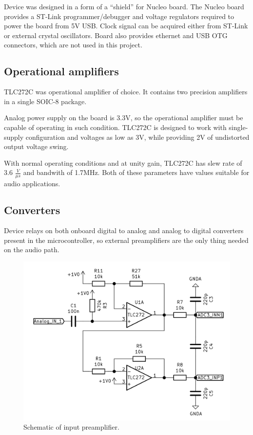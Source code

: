 \documentclass[a4paper,twoside,12pt]{book}
\begin{document}
Device was designed in a form of a “shield” for Nucleo board.
The Nucleo board provides a ST-Link programmer/debugger
and voltage regulators required to power the board from 5V USB.
Clock signal can be acquired either from ST-Link or
external crystal oscillators.
Board also provides ethernet and USB OTG connectors,
which are not used in this project.

\subsection {Operational amplifiers}
TLC272C was operational amplifier of choice\cite{TI:TLC272}.
It contains two precision amplifiers in a single SOIC-8 package.

Analog power supply on the board is 3.3V, so the operational amplifier
must be capable of operating in such condition.
TLC272C is designed to work with single-supply configuration
and voltages as low as 3V,
while providing 2V of undistorted output voltage swing.

With normal operating conditions and at unity gain,
TLC272C has slew rate of 3.6 \(\frac{V}{\mu s}\) and bandwith of 1.7MHz.
Both of these parameters have values suitable for audio applications.

\subsection{Converters}
Device relays on both onboard digital to analog
and analog to digital converters present in the microcontroller,
so external preamplifiers are the only thing needed on the audio path.

\begin{figure}[H]
    \centering
    \includegraphics[width=\textwidth]{images/Input_preamp}
    \caption{Schematic of input preamplifier.}
    \label{fig:input}
\end{figure}
\end{document}
